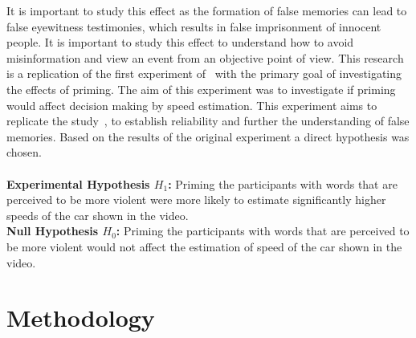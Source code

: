 \documentclass[11pt]{article}
\begin{document}
It is important to study this effect as the formation of false memories can lead to false eyewitness testimonies, which results in false imprisonment of innocent people. It is important to study this effect to understand how to avoid misinformation and view an event from an objective point of view.
This research is a replication of the first experiment of~\autocite{loftus1974} with the primary goal of investigating the effects of priming. 
The aim of this experiment was to investigate if priming would affect decision making by speed estimation. This experiment aims to replicate the study~\autocite{loftus1974}, to establish
reliability and further the understanding of false memories.
Based on the results of the original experiment a direct hypothesis was chosen.
\\\\
\textbf{Experimental Hypothesis $H_1$:} Priming the participants with words that are perceived to be more violent were more likely to estimate significantly higher speeds of the car shown in the video.
\\
\textbf{Null Hypothesis $H_0$:} Priming the participants with words that are perceived to be more violent would not affect the estimation of speed of the car shown in the video.



\section{Methodology}
\end{document}
